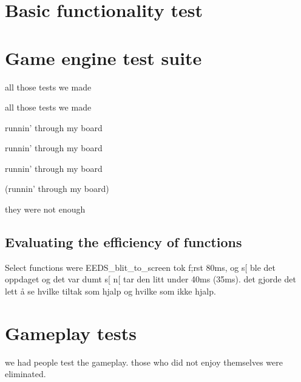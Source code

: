 \section{Basic functionality test}

\section{Game engine test suite}
	all those tests we made

	all those tests we made

	runnin' through my board

	runnin' through my board

	runnin' through my board

	(runnin' through my board)

	they were not enough
	\subsection{Evaluating the efficiency of functions}
		Select functions were 
		EEDS_blit_to_screen tok f;rst 80ms, og s[ ble det oppdaget og det var dumt s[ n[ tar den litt under 40ms (35ms).
		det gjorde det lett å se hvilke tiltak som hjalp og hvilke som ikke hjalp.


\section{Gameplay tests}
	we had people test the gameplay.
	those who did not enjoy themselves were eliminated.
